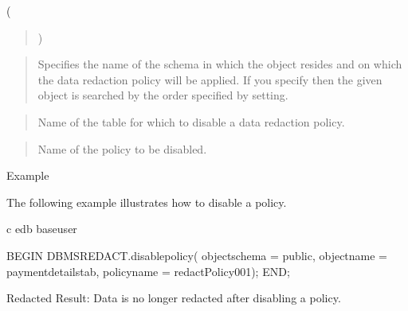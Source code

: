 \documentclass[letterpaper,10pt,english,openany,oneside]{sphinxmanual}
\begin{document}
 (
\begin{quote}




)
\end{quote}


\begin{quote}

Specifies the name of the schema in which the object resides and on
which the data redaction policy will be applied. If you specify 
then the given object is searched by the order specified by 
setting.
\end{quote}

\begin{quote}

Name of the table for which to disable a data redaction policy.
\end{quote}

\begin{quote}

Name of the policy to be disabled.
\end{quote}

Example

The following example illustrates how to disable a policy.

%
\begin{sphinxVerbatim}[commandchars=\\\{\}]
\PYGZbs{}c edb base\PYGZus{}user

BEGIN
  DBMS\PYGZus{}REDACT.disable\PYGZus{}policy(
    object\PYGZus{}schema =\PYGZgt{} \PYGZsq{}public\PYGZsq{},
    object\PYGZus{}name =\PYGZgt{} \PYGZsq{}payment\PYGZus{}details\PYGZus{}tab\PYGZsq{},
    policy\PYGZus{}name =\PYGZgt{} \PYGZsq{}redactPolicy\PYGZus{}001\PYGZsq{});
END;
\end{sphinxVerbatim}

Redacted Result: Data is no longer redacted after disabling a policy.

\newpage
\end{document}

